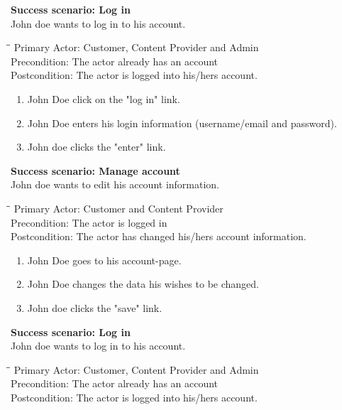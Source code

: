 \vspace{3mm}
\textbf{Success scenario: Log in} \\
John doe wants to log in to his account. 
\begin{tabbing}
\hspace{5mm}\=\hspace{26mm}\=\kill
\>Primary Actor:\> Customer, Content Provider and Admin\\
\>Precondition:\> The actor already has an account\\
\>Postcondition:\> The actor is logged into his/hers account.
\end{tabbing}
\begin{enumerate} \setlength{\itemsep}{-1mm}
	\item John Doe click on the "log in" link.
	\item John Doe enters his login information (username/email and password).
	\item John doe clicks the "enter" link.
\end{enumerate}
\vspace{3mm}
\textbf{Success scenario: Manage account} \\
John doe wants to edit his account information.
\begin{tabbing}
\hspace{5mm}\=\hspace{26mm}\=\kill
\>Primary Actor:\> Customer and Content Provider\\
\>Precondition:\> The actor is logged in\\
\>Postcondition:\> The actor has changed his/hers account information.
\end{tabbing}
\begin{enumerate} \setlength{\itemsep}{-1mm}
	\item John Doe goes to his account-page.
	\item John Doe changes the data his wishes to be changed.
	\item John doe clicks the "save" link.
\end{enumerate}
\vspace{3mm}
\textbf{Success scenario: Log in} \\
John doe wants to log in to his account. 
\begin{tabbing}
\hspace{5mm}\=\hspace{26mm}\=\kill
\>Primary Actor:\> Customer, Content Provider and Admin\\
\>Precondition:\> The actor already has an account\\
\>Postcondition:\> The actor is logged into his/hers account.
\end{tabbing}
